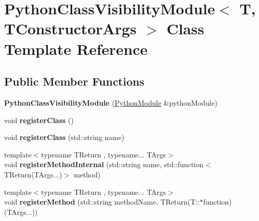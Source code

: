 \hypertarget{classPythonClassVisibilityModule}{}\section{Python\+Class\+Visibility\+Module$<$ T, T\+Constructor\+Args $>$ Class Template Reference}
\label{classPythonClassVisibilityModule}
\subsection*{Public Member Functions}
\begin{DoxyCompactItemize}
\item 
{\bfseries Python\+Class\+Visibility\+Module} (\hyperlink{classPythonModule}{Python\+Module} \&python\+Module)\hypertarget{classPythonClassVisibilityModule_a9f4211b08a952cb4a7ce5a0a9a866161}{}\label{classPythonClassVisibilityModule_a9f4211b08a952cb4a7ce5a0a9a866161}

\item 
void {\bfseries register\+Class} ()\hypertarget{classPythonClassVisibilityModule_ad724ff894b558bb539aae468c588a7e8}{}\label{classPythonClassVisibilityModule_ad724ff894b558bb539aae468c588a7e8}

\item 
void {\bfseries register\+Class} (std\+::string name)\hypertarget{classPythonClassVisibilityModule_ad369ee188db0b3106d95475a04c20142}{}\label{classPythonClassVisibilityModule_ad369ee188db0b3106d95475a04c20142}

\item 
{\footnotesize template$<$typename T\+Return , typename... T\+Args$>$ }\\void {\bfseries register\+Method\+Internal} (std\+::string name, std\+::function$<$ T\+Return(T\+Args...)$>$ method)\hypertarget{classPythonClassVisibilityModule_ab1a8185ec540e9b7ab87bbc28645b04e}{}\label{classPythonClassVisibilityModule_ab1a8185ec540e9b7ab87bbc28645b04e}

\item 
{\footnotesize template$<$typename T\+Return , typename... T\+Args$>$ }\\void {\bfseries register\+Method} (std\+::string method\+Name, T\+Return(T\+::$\ast$function)(T\+Args...))\hypertarget{classPythonClassVisibilityModule_ae487e49178aa20104ff287bc2b08d9ac}{}\label{classPythonClassVisibilityModule_ae487e49178aa20104ff287bc2b08d9ac}


\end{DoxyCompactItemize}
